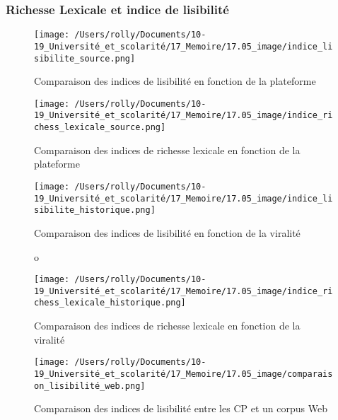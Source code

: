 \documentclass[12pt,a4paper,oneside,titlepage]{article} %
\begin{document}
	
	\subsubsection*{Richesse Lexicale et indice de lisibilité}
	
	
	
	\begin{figure}
		\centering
		\begin{minipage}[b]{0.45\textwidth}
			\texttt{[image: /Users/rolly/Documents/10-19\_Université\_et\_scolarité/17\_Memoire/17.05\_image/indice\_lisibilite\_source.png]}
			\caption{Comparaison des indices de lisibilité en fonction de la plateforme}
			\label{fig:image1}
		\end{minipage}
		\hfill
		\begin{minipage}[b]{0.45\textwidth}
			\texttt{[image: /Users/rolly/Documents/10-19\_Université\_et\_scolarité/17\_Memoire/17.05\_image/indice\_richess\_lexicale\_source.png]}
			\caption{Comparaison des indices de richesse lexicale en fonction de la plateforme}
			\label{fig:image2}
		\end{minipage}
	\end{figure}
	\begin{figure}
		\centering
		\begin{minipage}[b]{0.45\textwidth}
			\texttt{[image: /Users/rolly/Documents/10-19\_Université\_et\_scolarité/17\_Memoire/17.05\_image/indice\_lisibilite\_historique.png]}
			\caption{Comparaison des indices de lisibilité en fonction de la viralité}
			\label{fig:image1}o
		\end{minipage}
		\hfill
		\begin{minipage}[b]{0.45\textwidth}
			\texttt{[image: /Users/rolly/Documents/10-19\_Université\_et\_scolarité/17\_Memoire/17.05\_image/indice\_richess\_lexicale\_historique.png]}
			\caption{Comparaison des indices de richesse lexicale en fonction de la viralité}
			\label{fig:image2}
		\end{minipage}
	\end{figure}

\begin{figure}
	\texttt{[image: /Users/rolly/Documents/10-19\_Université\_et\_scolarité/17\_Memoire/17.05\_image/comparaison\_lisibilité\_web.png]}
	\caption{Comparaison des indices de lisibilité entre les CP et un corpus Web}
\end{figure}
\end{document}
